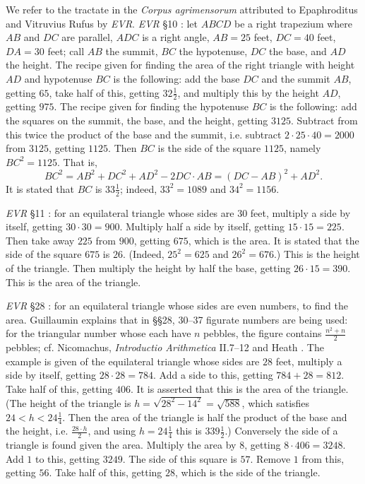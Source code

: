 \documentclass{article}
\theoremstyle{definition}
\begin{document}
We refer to the tractate in the {\em Corpus agrimensorum} attributed to Epaphroditus and Vitruvius Rufus by {\em EVR}. {\em EVR}  
\S 10 \cite[pp.~140--141]{guillaumin}: let $ABCD$ be a right trapezium where $AB$ and $DC$ are parallel, $ADC$ is a right angle,
$AB=25$ feet, $DC=40$ feet, $DA=30$ feet; call $AB$ the summit, $BC$ the hypotenuse, $DC$ the base, and $AD$ the height.
The recipe given for finding the area
of the right triangle with height $AD$ and hypotenuse $BC$ is the following:
add the base $DC$ and the summit $AB$, getting $65$,  take half of this, getting $32 \frac{1}{2}$, and multiply this
by the height $AD$, getting $975$. The recipe given for finding the
hypotenuse $BC$ is the following: add the 
squares on the summit, the base, and the height, getting $3125$. 
Subtract from this twice the product of the base and the summit, i.e. subtract $2 \cdot 25 \cdot 40 = 2000$ from $3125$, getting $1125$. Then $BC$ is the side
of the square $1125$, namely $BC^2=1125$. That is, 
\[
BC^2 = AB^2+DC^2+AD^2 - 2  DC \cdot AB = (DC-AB)^2 + AD^2.
\]
It is stated that $BC$ is $33 \frac{1}{2}$; indeed, $33^2=1089$ and $34^2=1156$.

{\em EVR} \S 11 \cite[pp.~140--143]{guillaumin}: for an equilateral triangle whose sides are $30$ feet,
multiply a side by itself, getting $30\cdot 30 = 900$. Multiply half a side by itself, getting $15\cdot 15 = 225$. Then take away $225$ from
$900$, getting $675$, which is the area. It is stated that the side of the square $675$ is $26$. (Indeed, $25^2=625$ and $26^2=676$.)
This is the height of the triangle.
Then multiply  the height by half the base, getting $26\cdot 15 = 390$. This is the area of the triangle.

{\em EVR} \S 28 \cite[pp.~158--163]{guillaumin}: for an equilateral triangle whose sides are even numbers,
to find the area. Guillaumin explains that in \S \S 28, 30--37 
figurate numbers are being used:
for the triangular number whose each have $n$ pebbles, the figure contains $\frac{n^2+n}{2}$ pebbles; cf.
Nicomachus, {\em Introductio Arithmetica} II.7--12 \cite[pp~239--249]{nicomachus} and Heath \cite[p.~76]{HGMI}. 
The example is given of the equilateral triangle whose sides are $28$ feet, 
multiply a side by itself, getting $28\cdot 28=784$. Add a side to this, getting $784+28=812$. Take half of this, getting $406$. It is asserted that this
is the area of the triangle. (The height of the triangle is $h=\sqrt{28^2-14^2}=\sqrt{588}$, which satisfies $24<h<24 \frac{1}{4}$. 
Then the area of the triangle is half the product of the base and the height, i.e. $\frac{28\cdot h}{2}$, and using $h=24 \frac{1}{4}$ this is
$339 \frac{1}{2}$.)
Conversely the side of a triangle is found given the area.
Multiply the area by $8$, getting $8\cdot 406 = 3248$. Add $1$ to this, getting $3249$. The side of this square is 
$57$. Remove $1$ from this, getting $56$. Take half of this, getting $28$, which is the side of the triangle. 
\end{document}
